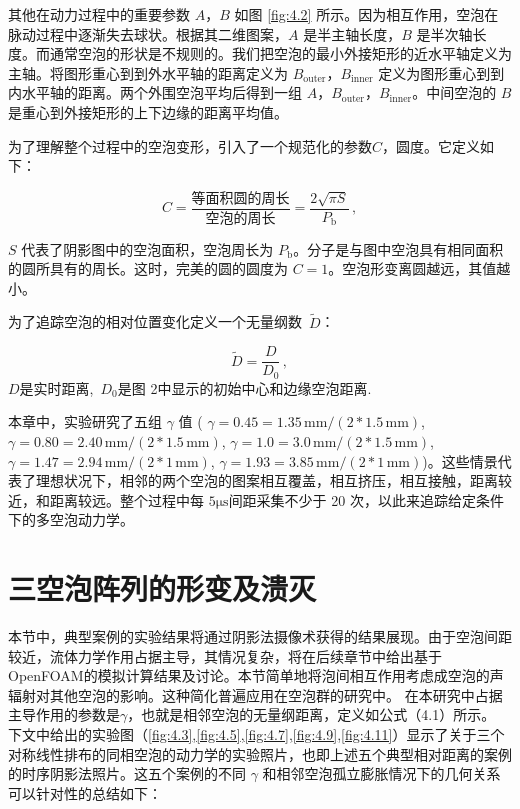 其他在动力过程中的重要参数 $A$，$B$ 如图  \ref{fig:4.2}
所示。因为相互作用，空泡在脉动过程中逐渐失去球状。根据其二维图案，$A$
是半主轴长度，$B$
是半次轴长度。而通常空泡的形状是不规则的。我们把空泡的最小外接矩形的近水平轴定义为主轴。将图形重心到到外水平轴的距离定义为
$B_\text{outer}$，$B_\text{inner}$
定义为图形重心到到内水平轴的距离。两个外围空泡平均后得到一组
$A$，$B_\text{outer}$，$B_\text{inner}$。中间空泡的 $B$
是重心到外接矩形的上下边缘的距离平均值。

为了理解整个过程中的空泡变形，引入了一个规范化的参数$C$，圆度。它定义如下：

\[C=\frac{\text{等面积圆的周长}}{\text{空泡的周长}}=\frac{2\sqrt{\pi S}}{P_{\text{b}}}\,,\]

$S$ 代表了阴影图中的空泡面积，空泡周长为
$P_\text{b}$。分子是与图中空泡具有相同面积的圆所具有的周长。这时，完美的圆的圆度为
$C=1$。空泡形变离圆越远，其值越小。

为了追踪空泡的相对位置变化定义一个无量纲数~$\tilde{D}$：

\[\tilde{D}=\frac{D}{D_{\text{0}}}\,,\] $D$是实时距离,~$D_0$是图
2中显示的初始中心和边缘空泡距离.

本章中，实验研究了五组 $\gamma$ 值 (
$\gamma=0.45=1.35\,\text{mm}/(2*1.5\,\text{mm})$,
$\gamma=0.80=2.40\,\text{mm} /(2*1.5\,\text{mm})$,
$\gamma=1.0=3.0\,\text{mm} /(2*1.5\,\text{mm})$,
$\gamma=1.47=2.94\,\text{mm} /(2*1\,\text{mm})$,
$\gamma= 1.93=3.85\,\text{mm} /(2*1\,\text{mm})$)。这些情景代表了理想状况下，相邻的两个空泡的图案相互覆盖，相互挤压，相互接触，距离较近，和距离较远。整个过程中每
$5\mathrm {\mu s }$间距采集不少于 20
次，以此来追踪给定条件下的多空泡动力学。

\section{三空泡阵列的形变及溃灭}

本节中，典型案例的实验结果将通过阴影法摄像术获得的结果展现。由于空泡间距较近，流体力学作用占据主导，其情况复杂，将在后续章节中给出基于OpenFOAM的模拟计算结果及讨论。本节简单地将泡间相互作用考虑成空泡的声辐射对其他空泡的影响。这种简化普遍应用在空泡群的研究中\cite{brennen_cavitation_2003,ohl_shockwave_2013,lv_experimental_2019}。
在本研究中占据主导作用的参数是$\gamma$，也就是相邻空泡的无量纲距离，定义如公式（4.1）所示。
下文中给出的实验图（\ref{fig:4.3},\ref{fig:4.5},\ref{fig:4.7},\ref{fig:4.9},\ref{fig:4.11}）显示了关于三个对称线性排布的同相空泡的动力学的实验照片，也即上述五个典型相对距离的案例的时序阴影法照片。这五个案例的不同
$\gamma$ 和相邻空泡孤立膨胀情况下的几何关系可以针对性的总结如下：

